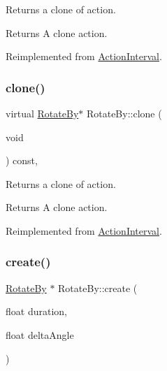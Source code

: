 Returns a clone of action.

\begin{DoxyReturn}{Returns}
A clone action. 
\end{DoxyReturn}


Reimplemented from \hyperlink{classActionInterval_abc93ce0c2f54a90eb216a7803f25f44a}{Action\+Interval}.

\mbox{\label{classRotateBy_ab60e1cfbd4a1d46c53ce44de44569e44}} 
\subsubsection{\texorpdfstring{clone()}{clone()}\hspace{0.1cm}{\footnotesize\ttfamily [2/2]}}
{\footnotesize\ttfamily virtual \hyperlink{classRotateBy}{Rotate\+By}$\ast$ Rotate\+By\+::clone (\begin{DoxyParamCaption}\item[{void}]{ }\end{DoxyParamCaption}) const\hspace{0.3cm}{\ttfamily [override]}, {\ttfamily [virtual]}}

Returns a clone of action.

\begin{DoxyReturn}{Returns}
A clone action. 
\end{DoxyReturn}


Reimplemented from \hyperlink{classActionInterval_abc93ce0c2f54a90eb216a7803f25f44a}{Action\+Interval}.

\mbox{\label{classRotateBy_af69a17d58dcae01e7c9186cc66a992c5}} 
\subsubsection{\texorpdfstring{create()}{create()}\hspace{0.1cm}{\footnotesize\ttfamily [1/6]}}
{\footnotesize\ttfamily \hyperlink{classRotateBy}{Rotate\+By} $\ast$ Rotate\+By\+::create (\begin{DoxyParamCaption}\item[{float}]{duration,  }\item[{float}]{delta\+Angle }\end{DoxyParamCaption})\hspace{0.3cm}{\ttfamily [static]}}


